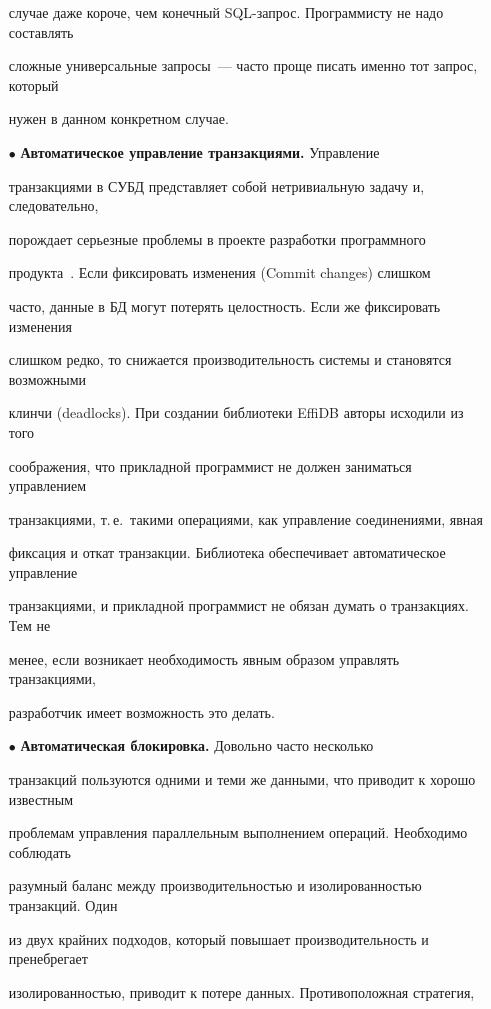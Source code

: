 \begin{multicols}{2}
\begin{itemize}
случае даже короче, чем конечный SQL-за\-прос. Программисту не надо составлять 

сложные универсальные запросы~--- часто проще писать именно тот запрос, который 

нужен в данном конкретном случае.

\item[$\bullet$] \textbf{Автоматическое управление транзакциями.} Управление 

транзакциями в СУБД представляет собой нетривиальную задачу и, следовательно, 

порождает серьезные проблемы в проекте разработки программного 

продукта~\cite{4-y, 3-y}. Если фиксировать изменения (Commit changes) слишком 

часто, данные в БД могут потерять целостность. Если же фиксировать изменения 

слишком редко, то снижается производительность системы и становятся возможными 

клинчи (deadlocks). При создании библиотеки EffiDB авторы исходили из того 

соображения, что прикладной программист не должен заниматься управлением 

транзакциями, т.\,е.\ такими операциями, как управление соединениями, явная 

фиксация и откат транзакции. Библиотека обеспечивает автоматическое управление 

транзакциями, и прикладной программист не обязан думать о транзакциях. Тем не 

менее, если возникает необходимость явным образом управлять транзакциями, 

разработчик имеет возможность это делать.

\item[$\bullet$] \textbf{Автоматическая блокировка.} Довольно часто несколько 

транзакций пользуются одними и теми же данными, что приводит к хорошо известным 

проблемам управления параллельным выполнением операций. Необходимо соблюдать 

разумный баланс между произво\-ди\-тель\-ностью и изолированностью транзакций. Один 

из двух крайних подходов, который повышает производительность и пренебрегает 

изолированностью, приводит к потере данных. Противоположная стратегия, 


\end{itemize}
\end{multicols}
